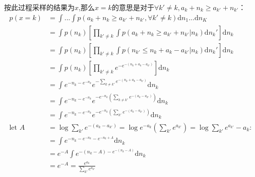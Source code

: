 按此过程采样的结果为$x$,那么$x=k$的意思是对于$\forall k' \ne k, a_k + n_k \ge a_{k'} + n_{k'} $：
\begin{displaymath}
\begin{split}
p(x=k) &= \int ...\int{p(a_k + n_k \ge a_{k'} + n_{k'}, \forall k' \ne k)} \mathrm{d}n_1 ... \mathrm{d}n_K\\
&=\int p(n_k) \left[   \prod_{k' \neq k} \int p(a_k + n_k \ge a_{k'} + n_{k'}|n_k) \mathrm{d} n_{k}'  \right] \mathrm{d} n_k\\
&=\int p(n_k) \left[   \prod_{k' \neq k} \int p(n_{k'} \leq n_k + a_k - a_{k'}|n_k) \mathrm{d} n_{k}'  \right] \mathrm{d} n_k\\
&=\int p(n_k) \left[   \prod_{k' \neq k} e^{-e^{-(n_k+a_k-a_{k'})}}  \right] \mathrm{d} n_k\\
&=\int  e^{-n_k - e^{-n_k}} e^{-{\sum_{k \ne k'}{e^{-(n_k+a_k-a_{k'})}}}} \mathrm{d} n_k\\
&=\int  e^{-n_k - e^{-n_k}} e^{-e^{-n_k}(\sum_{k \ne k'}{e^{-(a_k-a_{k'})}})} \mathrm{d} n_k\\
&=\int  e^{-n_k - e^{-n_k}}e^{-e^{-n_k} (\sum_{k'}{e^{-(a_k-a_{k'})}})} \mathrm{d} n_k\\
\text{let } A &=\log \sum_{k'} e^{-(a_k-a_{k'})} = \log e^{-a_k} (\sum_{k'} e^{a_{k'}}) = \log{\sum_{k'} e^{a_{k'}}} -a_k:\\
&= \int e^{-n_k - e^{-n_k} - e^{-n_k  + A}} \mathrm{d} n_k\\
&=e^{-A} \int e^{-(n_k-A)-e^{-(n_k-A)}} \mathrm{d} n_k\\
&= e^{-A} = \frac{e^{a_k}}{\sum_{k'}{e^{a_{k'}}}}
\end{split}
\end{displaymath}




